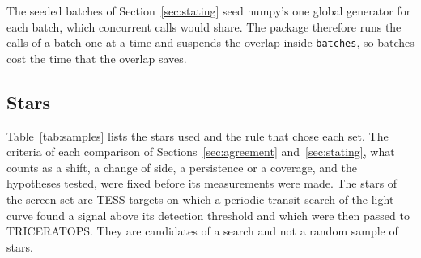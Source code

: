 \documentclass[11pt]{article}
\begin{document}
The seeded batches of Section~\ref{sec:stating} seed numpy's one global generator for each batch, which concurrent calls would share. The package therefore runs the calls of a batch one at a time and suspends the overlap inside \texttt{batches}, so batches cost the time that the overlap saves.

\subsection{Stars}\label{sec:samples}

Table~\ref{tab:samples} lists the stars used and the rule that chose each set. The criteria of each comparison of Sections~\ref{sec:agreement} and~\ref{sec:stating}, what counts as a shift, a change of side, a persistence or a coverage, and the hypotheses tested, were fixed before its measurements were made. 
The stars of the screen set are TESS targets on which a periodic transit search of the light curve found a signal above its detection threshold and which were then passed to TRICERATOPS. They are candidates of a search and not a random sample of stars.
\end{document}
